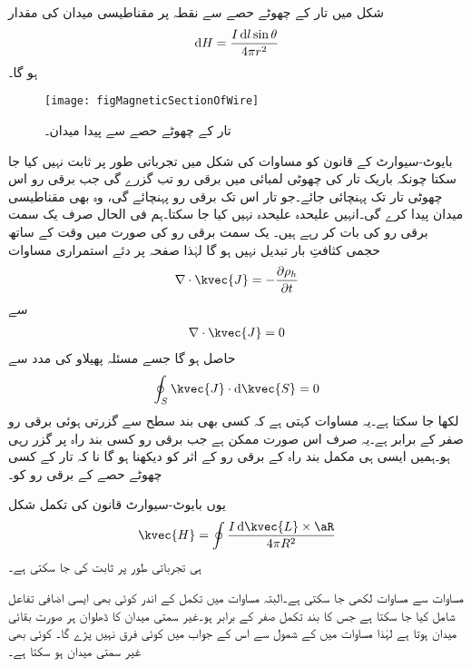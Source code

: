 شکل  میں تار کے چھوٹے حصے  سے نقطہ  پر مقناطیسی میدان کی مقدار
\begin{align}\label{مساوات_مقناطیسی_تار_کا_ٹکڑا_اور_میدان}
\dif H=\frac{I \dif l \sin \theta}{4\pi r^2}
\end{align}
ہو گا۔

\begin{figure}
\centering
\texttt{[image: figMagneticSectionOfWire]}
\caption{تار کے چھوٹے حصے سے پیدا میدان۔}
\label{شکل_مقناطیسی_تار_کا_ٹکڑا_اور_میدان}
\end{figure}
بایوٹ-سیوارٹ کے قانون کو مساوات  کی شکل میں تجرباتی طور پر ثابت نہیں کیا جا سکتا چونکہ باریک تار کی چھوٹی لمبائی میں برقی رو تب گزرے گی جب برقی رو اس چھوٹی تار تک پہنچائی جائے۔جو تار اس تک برقی رو پہنچائے گی، وہ بھی مقناطیسی میدان پیدا کرے گی۔انہیں علیحدہ علیحدہ نہیں کیا جا سکتا۔ہم فی الحال صرف یک سمت برقی رو کی بات کر رہے ہیں۔ یک سمت برقی رو کی صورت میں وقت کے ساتھ حجمی کثافتِ بار تبدیل نہیں ہو گا لہٰذا صفحہ  پر دئے  استمراری مساوات
\begin{align*}
\nabla \cdot \kvec{J}=-\frac{\partial \rho_h}{\partial t}
\end{align*}
سے
\begin{align}\label{مساوات_مقناطیسی_صرف_مکمل_بند_راہ}
\nabla \cdot \kvec{J}=0
\end{align}
حاصل ہو گا جسے مسئلہ پھیلاو کی مدد سے
\begin{align*}
\oint_S  \kvec{J} \cdot \dif \kvec{S}=0
\end{align*}
لکھا جا سکتا ہے۔یہ مساوات کہتی ہے کہ کسی بھی بند سطح سے گزرتی ہوئی برقی رو صفر کے برابر ہے۔یہ صرف اس صورت ممکن ہے جب برقی رو کسی بند راہ پر گزر رہی ہو۔ہمیں ایسی ہی مکمل بند راہ کے برقی رو کے اثر کو دیکھنا ہو گا نا کہ تار کے کسی چھوٹے حصے  کے برقی رو کو۔ 

یوں بایوٹ-سیوارٹ قانون کی تکمل شکل
\begin{align}\label{مساوات_بایوٹ_سیوارٹ_تکمل_شکل}
\kvec{H}=\oint \frac{I \dif \kvec{L} \times \aR}{4 \pi R^2}
\end{align}
ہی تجرباتی طور پر ثابت کی جا سکتی ہے۔

مساوات  سے مساوات  لکھی جا سکتی ہے۔البتہ مساوات  میں تکمل کے اندر کوئی بھی ایسی اضافی تفاعل شامل کیا جا سکتا ہے جس کا بند تکمل صفر کے برابر ہو۔غیر سمتی میدان کا ڈھلوان ہر صورت بقائی میدان ہوتا ہے لہٰذا مساوات  میں  کے شمول سے اس کے جواب میں کوئی فرق نہیں پڑے گا۔ کوئی بھی غیر سمتی میدان ہو سکتا ہے۔

